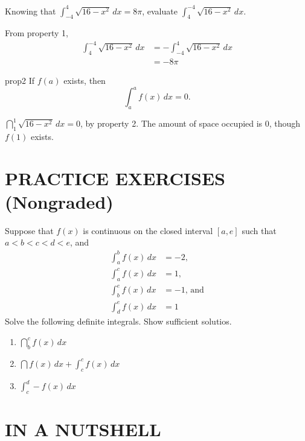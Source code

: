 \documentclass[11pt, a4paper]{article}
\begin{document}
\begin{example}
Knowing that $\int_{-4}^4\sqrt{16-x^2}\, dx=8\pi$, evaluate $\int_4^{-4}\sqrt{16-x^2}\, dx$.
\end{example}

From property 1,
\begin{align*}
\int_4^{-4}\sqrt{16-x^2}\,dx &= -\int_{-4}^4\sqrt{16-x^2}\, dx\\
	&= -8\pi
\end{align*}

\newpage
\begin{property}[]{prop2}
If $f(a)$ exists, then
\begin{equation}
\int_a^a f(x)\, dx = 0.
\end{equation}
\end{property}

\begin{example}
$\dint_1^1\sqrt{16-x^2}\,dx=0$, by property 2. The amount of space occupied is 0, though $f(1)$ exists.
\end{example}


\section*{PRACTICE EXERCISES (Nongraded)}

Suppose that $f(x)$ is continuous on the closed interval $[a,e]$ such that $a<b<c<d<e$, and
\begin{align*}
\int_a^b f(x)\, dx & = -2,\\
\int_a^c f(x)\, dx & = 1,\\
\int_b^e f(x)\, dx & =-1,\,\text{and}\\
\int_d^e f(x)\, dx & = 1
\end{align*}
Solve the following definite integrals. Show sufficient solutios.

\begin{enumerate}
\item $\dint_b^c f(x)\, dx$
\item $\dint f(x)\, dx+\int_c^c f(x)\, dx$
\item $\int_c^d-f(x)\, dx$
\end{enumerate}


\section*{IN A NUTSHELL}
\end{document}
